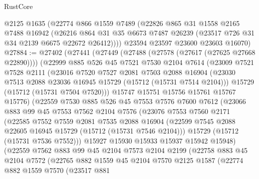 \begin{lexlean}{RustCore}
\begin{coremodule}
      @2125
      @1635
      (@22774
        @866
        @1559
        @7489
        (@22826
          @865
          @31
          @1558
          @2165
          @7488
          @16942
          (@26216 @864 @31 @35 @6673 @7487 @26239 (@23517 @726 @31 @34 @2139 @6675 @22672 @26412))))
      @23594
      @23597
      @23600
      @23603
      @16070)
@27884 := @27402
    (@27441
      (@27449
        (@27488 (@27578 (@27617 (@27625 @27668 @22890))))
        (@22999
          @885
          @526
          @45
          @7521
          @7530
          @2104
          @7614
          (@23009
            @7521
            @7528
            @2111
            (@23016
              @7520
              @7527
              @2081
              @7503
              @2088
              @16904
              (@23030 @7513 @2088 @23036 @16945 @15729 (@15712 (@15731 @7514 @2104)))
              @15729
              (@15712 (@15731 @7504 @7520)))
            @15747
            @15751
            @15756
            @15761
            @15767
            @15776)
          (@22559
            @7530
            @885
            @526
            @45
            @7553
            @7576
            @7600
            @7612
            (@23066
              @883
              @99
              @45
              @7553
              @7562
              @2104
              @7576
              (@23076
                @7553
                @7560
                @2171
                (@22585
                  @7552
                  @7559
                  @2081
                  @7535
                  @2088
                  @16904
                  (@22599 @7545 @2088 @22605 @16945 @15729 (@15712 (@15731 @7546 @2104)))
                  @15729
                  (@15712 (@15731 @7536 @7552)))
                @15927
                @15930
                @15933
                @15937
                @15942
                @15948)
              (@22559
                @7562
                @883
                @99
                @45
                @2104
                @7573
                @2104
                @2199
                (@22758
                  @883
                  @45
                  @2104
                  @7572
                  (@22765
                    @882
                    @1559
                    @45
                    @2104
                    @7570
                    @2125
                    @1587
                    (@22774
                      @882
                      @1559
                      @7570
                      (@23517
                        @881

\end{coremodule}
\end{lexlean}
